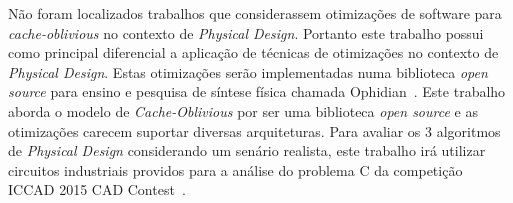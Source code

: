 Não foram localizados trabalhos que considerassem otimizações de software para \textit{cache-oblivious} no contexto de \textit{Physical Design}.
Portanto este trabalho possui como principal diferencial a aplicação de técnicas de otimizações no contexto de \textit{Physical Design}.
Estas otimizações serão implementadas numa biblioteca \textit{open source} para ensino e pesquisa de síntese física chamada Ophidian~\cite{ophidian}.
Este trabalho aborda o modelo de \textit{Cache-Oblivious} por ser uma biblioteca \textit{open source}                                                                                                                                                                e as otimizações carecem suportar diversas arquiteturas.
Para avaliar os 3 algoritmos de \textit{Physical Design} considerando um senário realista, este trabalho irá utilizar circuitos industriais providos para a análise do problema C da competição ICCAD 2015 CAD Contest~\cite{kim2015}.
